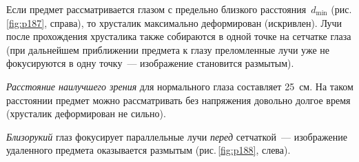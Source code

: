\documentclass[main.tex]{subfiles}
\begin{document}
Если предмет рассматривается глазом с предельно близкого расстояния~$d_\text{min}$ (рис.\,\ref{fig:p187}, справа), то хрусталик максимально деформирован (искривлен). Лучи после прохождения хрусталика также собираются в одной точке на сетчатке глаза (при дальнейшем приближении предмета к глазу преломленные лучи уже не фокусируются в одну точку~--- изображение становится размытым). 

\emph{Расстояние наилучшего зрения} для нормального глаза составляет 25~см. На таком расстоянии предмет можно рассматривать без напряжения довольно долгое время (хрусталик деформирован не сильно).  

\emph{Близорукий} глаз фокусирует параллельные лучи \emph{перед} сетчаткой~--- изображение удаленного предмета оказывается размытым (рис.\,\ref{fig:p188}, слева). 
\end{document}
